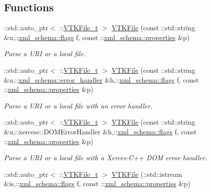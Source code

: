 \subsection*{Functions}
\begin{DoxyCompactItemize}
\item 
\-::std\-::auto\-\_\-ptr$<$ \-::\hyperlink{classVTKFile__t}{V\-T\-K\-File\-\_\-t} $>$ \hyperlink{vtk-unstructured_8cpp_a7c23f47cd1d791b22bff78904defd7eb}{V\-T\-K\-File} (const \-::std\-::string \&u,\-::\hyperlink{namespacexml__schema_a8d981c127a1f5106d04ad5853e707361}{xml\-\_\-schema\-::flags} f, const \-::\hyperlink{namespacexml__schema_aba199bc39c8b21c427369c27d2bcfc8c}{xml\-\_\-schema\-::properties} \&p)
\begin{DoxyCompactList}\small\item\em Parse a U\-R\-I or a local file. \end{DoxyCompactList}\item 
\-::std\-::auto\-\_\-ptr$<$ \-::\hyperlink{classVTKFile__t}{V\-T\-K\-File\-\_\-t} $>$ \hyperlink{vtk-unstructured_8cpp_a88b6537c9daeb6b997120080b41f58e9}{V\-T\-K\-File} (const \-::std\-::string \&u,\-::\hyperlink{namespacexml__schema_abdee01986b8e16f04af47dd12038261e}{xml\-\_\-schema\-::error\-\_\-handler} \&h,\-::\hyperlink{namespacexml__schema_a8d981c127a1f5106d04ad5853e707361}{xml\-\_\-schema\-::flags} f, const \-::\hyperlink{namespacexml__schema_aba199bc39c8b21c427369c27d2bcfc8c}{xml\-\_\-schema\-::properties} \&p)
\begin{DoxyCompactList}\small\item\em Parse a U\-R\-I or a local file with an error handler. \end{DoxyCompactList}\item 
\-::std\-::auto\-\_\-ptr$<$ \-::\hyperlink{classVTKFile__t}{V\-T\-K\-File\-\_\-t} $>$ \hyperlink{vtk-unstructured_8cpp_acec6a0976b0c88545964e132138b0380}{V\-T\-K\-File} (const \-::std\-::string \&u,\-::xercesc\-::\-D\-O\-M\-Error\-Handler \&h,\-::\hyperlink{namespacexml__schema_a8d981c127a1f5106d04ad5853e707361}{xml\-\_\-schema\-::flags} f, const \-::\hyperlink{namespacexml__schema_aba199bc39c8b21c427369c27d2bcfc8c}{xml\-\_\-schema\-::properties} \&p)
\begin{DoxyCompactList}\small\item\em Parse a U\-R\-I or a local file with a Xerces-\/\-C++ D\-O\-M error handler. \end{DoxyCompactList}\item 
\-::std\-::auto\-\_\-ptr$<$ \-::\hyperlink{classVTKFile__t}{V\-T\-K\-File\-\_\-t} $>$ \hyperlink{vtk-unstructured_8cpp_a614c44588111461ff8af6c4958a7f346}{V\-T\-K\-File} (\-::std\-::istream \&is,\-::\hyperlink{namespacexml__schema_a8d981c127a1f5106d04ad5853e707361}{xml\-\_\-schema\-::flags} f, const \-::\hyperlink{namespacexml__schema_aba199bc39c8b21c427369c27d2bcfc8c}{xml\-\_\-schema\-::properties} \&p)

\end{DoxyCompactItemize}
